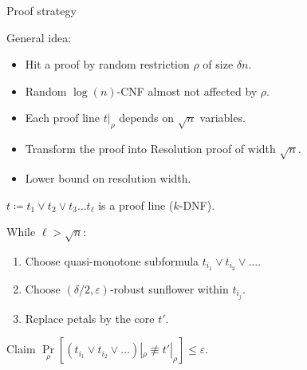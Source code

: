 \begin{frame}{Proof strategy}

    General idea:
    \begin{itemize}
        \item Hit a proof by random restriction $\rho$ of size $\delta n$.
            \pause
        \item Random $\log(n)$-CNF \alert{almost} not affected by $\rho$.
            \pause
        \item Each proof line $t|_{\rho}$ depends on $\sqrt{n}$ variables. 
            \pause
        \item Transform the proof into Resolution proof of width $\sqrt{n}$.
            \pause
        \item Lower bound on resolution width.
    \end{itemize}

    \pause
    \vspace{0.5cm}

    $t \coloneqq t_1 \lor t_2 \lor t_3 \dots t_{\ell}$ is a proof line ($k$-DNF).

    \pause
    \vspace{0.3cm}
    While $\ell > \sqrt{n}$:
    \begin{enumerate}
        \item Choose \alert{quasi}-monotone subformula $t_{i_1} \lor t_{i_2} \lor \dots$.
        \item Choose $(\delta / 2, \varepsilon)$-robust sunflower within $t_{i_j}$.
        \item Replace petals by the core $t'$.
    \end{enumerate}

    \begin{block}{Claim}
        $\Pr\limits_{\rho}[(t_{i_1} \lor t_{i_2} \lor \dots)|_{\rho} \not\equiv t'|_{\rho}] \le \varepsilon$. 
    \end{block}
\end{frame}


